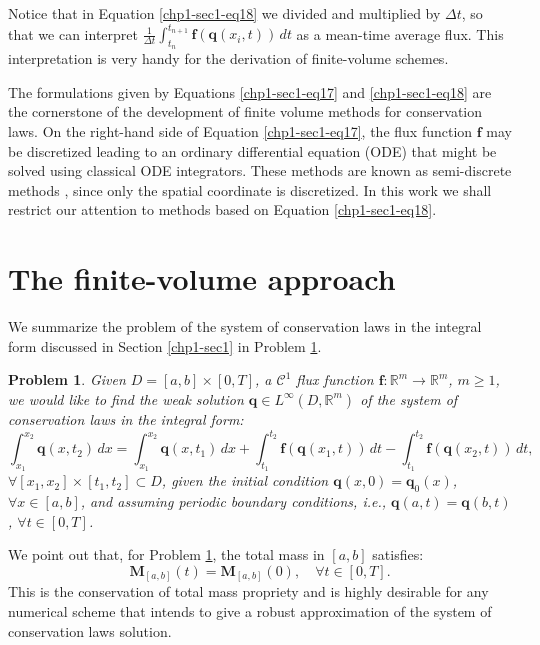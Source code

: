 Notice that in Equation \eqref{chp1-sec1-eq18} we divided and multiplied by $\Delta t$, so that 
we can interpret $\frac{1}{\Delta t}\int_{t_n}^{t_{n+1}}
\mathbf{f}(\mathbf{q}(x_{i}, t)) \,dt $ as a mean-time average flux.
This interpretation is very handy for the derivation of finite-volume schemes.

The formulations given by Equations \eqref{chp1-sec1-eq17} and \eqref{chp1-sec1-eq18} are the cornerstone 
of the development of finite volume methods for conservation laws. 
On the right-hand side of Equation \eqref{chp1-sec1-eq17}, the flux function $\mathbf{f}$ 
may be discretized leading to an ordinary differential equation (ODE)
that might be solved using classical ODE integrators. 
These methods are known as semi-discrete methods \citep{leveque:2002}, since only the spatial coordinate is discretized.
In this work we shall restrict our attention to methods based on Equation \eqref{chp1-sec1-eq18}.

\section{The finite-volume approach}
\label{chp1-sec2}
We summarize the problem of the system of conservation laws in the integral form 
discussed in Section \ref{chp1-sec1} in Problem \ref{chp1-sec2-prob1}.

\theoremstyle{plain} %
\newtheorem{prob}{Problem}[chapter]

\begin{prob}
	\label{chp1-sec2-prob1}
	Given $ D = [a,b] \times [0,T]$, a $\mathcal{C}^1$ 
	flux function $\mathbf{f}: \mathbb{R}^m \to \mathbb{R}^m $,
	$m \geq 1$, we would like to find the weak solution
	$ \mathbf{q} \in L^{\infty}(D, \mathbb{R}^m)$ 
	of the system of conservation laws in the integral form:
	\begin{equation*}
	        \int_{x_1}^{x_2} \mathbf{q}(x, t_2) \,dx = 
       		\int_{x_1}^{x_2} \mathbf{q}(x, t_1) \,dx + 
        	\int_{t_1}^{t_2} \mathbf{f}(\mathbf{q}(x_1, t)) \,dt -
		\int_{t_1}^{t_2}\mathbf{f}(\mathbf{q}(x_2, t)) \,dt ,
	\end{equation*}
	$\forall [x_1, x_2]\times[t_1, t_2] \subset D$, 
	given the initial condition 
	$\mathbf{q}(x,0) = \mathbf{q}_0(x)$, $\forall x \in [a,b]$, 
	and assuming periodic boundary conditions, 
	\textit{i.e.}, $\mathbf{q}(a,t) = \mathbf{q}(b,t)$, $\forall t \in [0,T]$.
\end{prob}

We point out that, for Problem \ref{chp1-sec2-prob1}, 
the total mass in $[a,b]$ satisfies: 
\begin{equation}
	\mathbf{M}_{[a,b]}(t) = \mathbf{M}_{[a,b]}(0), \quad \forall t \in [0,T].
\end{equation}
This is the conservation of total mass propriety and is highly desirable
for any numerical scheme that intends to give a robust approximation of the 
system of conservation laws solution.

